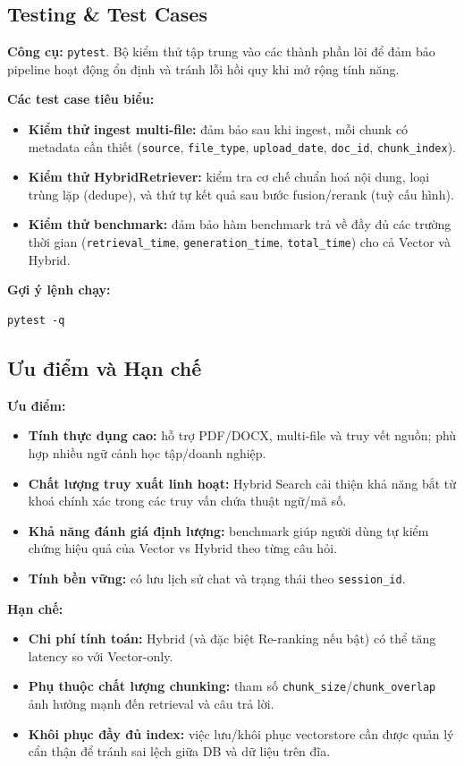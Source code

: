 \documentclass[10pt, conference, a4paper, compsocconf]{IEEEtran}
\begin{document}
\subsection{Testing \& Test Cases}
\textbf{Công cụ:} \texttt{pytest}. Bộ kiểm thử tập trung vào các thành phần lõi để đảm bảo pipeline hoạt động ổn định và tránh lỗi hồi quy khi mở rộng tính năng.

\textbf{Các test case tiêu biểu:}
\begin{itemize}
  \item \textbf{Kiểm thử ingest multi-file:} đảm bảo sau khi ingest, mỗi chunk có metadata cần thiết (\texttt{source}, \texttt{file\_type}, \texttt{upload\_date}, \texttt{doc\_id}, \texttt{chunk\_index}).
  \item \textbf{Kiểm thử HybridRetriever:} kiểm tra cơ chế chuẩn hoá nội dung, loại trùng lặp (dedupe), và thứ tự kết quả sau bước fusion/rerank (tuỳ cấu hình).
  \item \textbf{Kiểm thử benchmark:} đảm bảo hàm benchmark trả về đầy đủ các trường thời gian (\texttt{retrieval\_time}, \texttt{generation\_time}, \texttt{total\_time}) cho cả Vector và Hybrid.
\end{itemize}

\textbf{Gợi ý lệnh chạy:}
\begin{verbatim}
pytest -q
\end{verbatim}

\subsection{Ưu điểm và Hạn chế}
\textbf{Ưu điểm:}
\begin{itemize}
  \item \textbf{Tính thực dụng cao:} hỗ trợ PDF/DOCX, multi-file và truy vết nguồn; phù hợp nhiều ngữ cảnh học tập/doanh nghiệp.
  \item \textbf{Chất lượng truy xuất linh hoạt:} Hybrid Search cải thiện khả năng bắt từ khoá chính xác trong các truy vấn chứa thuật ngữ/mã số.
  \item \textbf{Khả năng đánh giá định lượng:} benchmark giúp người dùng tự kiểm chứng hiệu quả của Vector vs Hybrid theo từng câu hỏi.
  \item \textbf{Tính bền vững:} có lưu lịch sử chat và trạng thái theo \texttt{session\_id}.
\end{itemize}

\textbf{Hạn chế:}
\begin{itemize}
  \item \textbf{Chi phí tính toán:} Hybrid (và đặc biệt Re-ranking nếu bật) có thể tăng latency so với Vector-only.
  \item \textbf{Phụ thuộc chất lượng chunking:} tham số \texttt{chunk\_size}/\texttt{chunk\_overlap} ảnh hưởng mạnh đến retrieval và câu trả lời.
  \item \textbf{Khôi phục đầy đủ index:} việc lưu/khôi phục vectorstore cần được quản lý cẩn thận để tránh sai lệch giữa DB và dữ liệu trên đĩa.
\end{itemize}
\end{document}
